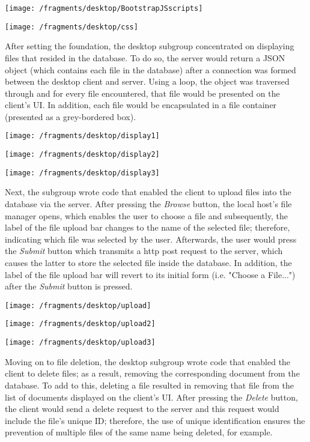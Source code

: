 \documentclass{article}
\begin{document}
\texttt{[image: /fragments/desktop/BootstrapJSscripts]}

\texttt{[image: /fragments/desktop/css]}

After setting the foundation, the desktop subgroup concentrated on displaying files that resided in the database. To do so, the server would return a JSON object (which contains each file in the database) after a connection was formed between the desktop client and server. Using a loop, the object was traversed through and for every file encountered, that file would be presented on the client's UI. In addition, each file would be encapsulated in a file container (presented as a grey-bordered box).

\texttt{[image: /fragments/desktop/display1]}

\texttt{[image: /fragments/desktop/display2]}

\texttt{[image: /fragments/desktop/display3]}

Next, the subgroup wrote code that enabled the client to upload files into the database via the server. After pressing the \textit{Browse} button, the local host's file manager opens, which enables the user to choose a file and subsequently, the label of the file upload bar changes to the name of the selected file; therefore, indicating which file was selected by the user. Afterwards, the user would press the \textit{Submit} button which transmits a http post request to the server, which causes the latter to store the selected file inside the database. In addition, the label of the file upload bar will revert to its initial form (i.e. "Choose a File...") after the \textit{Submit} button is pressed.

\texttt{[image: /fragments/desktop/upload]}

\texttt{[image: /fragments/desktop/upload2]}

\texttt{[image: /fragments/desktop/upload3]}

Moving on to file deletion, the desktop subgroup wrote code that enabled the client to delete files; as a result, removing the corresponding document from the database. To add to this, deleting a file resulted in removing that file from the list of documents displayed on the client's UI. After pressing the \textit{Delete} button, the client would send a delete request to the server and this request would include the file's unique ID; therefore, the use of unique identification ensures the prevention of multiple files of the same name being deleted, for example.
\end{document}
